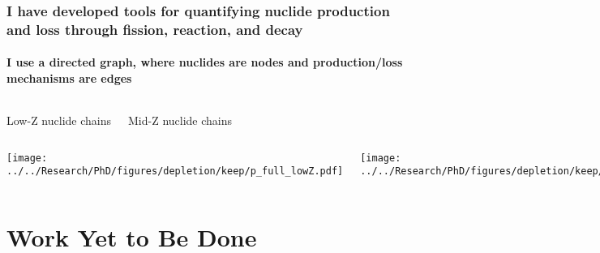 \documentclass[compress,10pt]{beamer}
\begin{document}
\begin{frame}
    \frametitle{I have developed tools for quantifying nuclide production and loss through fission, reaction, and decay}
    \framesubtitle{I use a directed graph, where nuclides are nodes and production/loss mechanisms are edges}

    \vspace{-2mm}

    \centering
    \begin{columns}[t]


        \centering
        {\small Low-Z nuclide chains}


        \centering
        {\small Mid-Z nuclide chains}

    \end{columns}

    \begin{columns}[c]


        \centering
        {}\texttt{[image: ../../Research/PhD/figures/depletion/keep/p\_full\_lowZ.pdf]} \\


        \centering
        {}\texttt{[image: ../../Research/PhD/figures/depletion/keep/p\_final\_midZ.pdf]} \\

    \end{columns}

\end{frame}



\section{Work Yet to Be Done}
\end{document}
